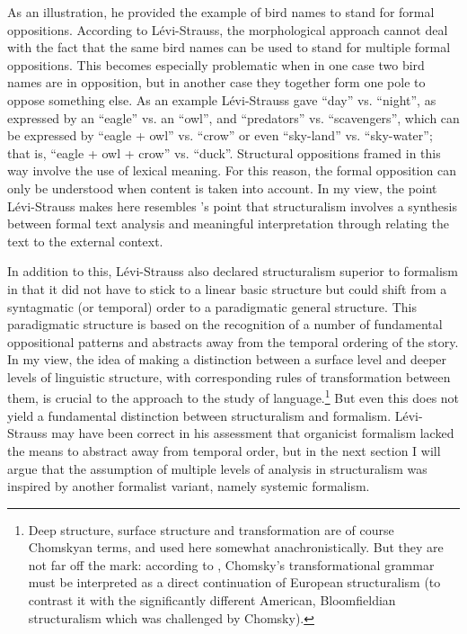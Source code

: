 \documentclass[output=paper]{langscibook}
\begin{document}
As an illustration, he provided the example of bird names to stand for formal oppositions. According to Lévi-Strauss, the morphological approach cannot deal with the fact that the same bird names can be used to stand for multiple formal oppositions. This becomes especially problematic when in one case two bird names are in opposition, but in another case they together form one pole to oppose something else. As an example Lévi-Strauss gave ``day'' vs. ``night'', as expressed by an ``eagle'' vs. an ``owl'', and ``predators'' vs. ``scavengers'', which can be expressed by ``eagle + owl'' vs. ``crow'' or even ``sky-land'' vs. ``sky-water''; that is, ``eagle + owl + crow'' vs. ``duck''. Structural oppositions framed in this way involve the use of lexical meaning. For this reason, the formal opposition can only be understood when content is taken into account. In my view, the point Lévi-Strauss makes here resembles {\Mukarovsky}'s point that structuralism involves a synthesis between formal text analysis and meaningful interpretation through relating the text to the external context.

\largerpage
In addition to this, Lévi-Strauss also declared structuralism superior to formalism in that it did not have to stick to a linear basic structure but could shift from a syntagmatic (or temporal) order to a paradigmatic general structure. This paradigmatic structure is based on the recognition of a number of fundamental oppositional patterns and abstracts away from the temporal ordering of the story. In my view, the idea of making a distinction between a surface level and deeper levels of linguistic structure, with corresponding rules of transformation between them, is crucial to the  approach to the study of language.\footnote{Deep structure, surface structure and transformation are of course Chomskyan terms, and used here somewhat anachronistically. But they are not far off the mark: according to \citet[1899--1900]{Joseph2001}, Chomsky's transformational grammar must be interpreted as a direct continuation of European structuralism (to contrast it with the significantly different American, Bloomfieldian structuralism which was challenged by Chomsky).} But even this does not yield a fundamental distinction between structuralism and formalism. Lévi-Strauss may have been correct in his assessment that organicist formalism lacked the means to abstract away from temporal order, but in the next section I will argue that the assumption of multiple levels of analysis in structuralism was inspired by another formalist variant, namely systemic formalism. 
\end{document}
